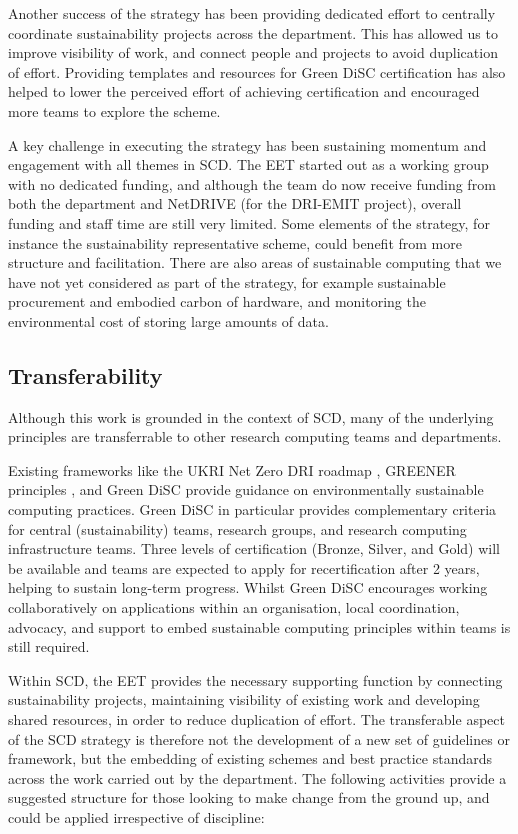 \documentclass[sigconf]{acmart}
\begin{document}
Another success of the strategy has been providing dedicated effort to centrally coordinate sustainability projects across the department. This has allowed us to improve visibility of work, and connect people and projects to avoid duplication of effort. Providing templates and resources for Green DiSC certification has also helped to lower the perceived effort of achieving certification and encouraged more teams to explore the scheme.

A key challenge in executing the strategy has been sustaining momentum and engagement with all themes in SCD. The EET started out as a working group with no dedicated funding, and although the team do now receive funding from both the department and NetDRIVE (for the DRI-EMIT project), overall funding and staff time are still very limited. Some elements of the strategy, for instance the sustainability representative scheme, could benefit from more structure and facilitation. There are also areas of sustainable computing that we have not yet considered as part of the strategy, for example sustainable procurement and embodied carbon of hardware, and monitoring the environmental cost of storing large amounts of data.

\subsection{Transferability}
Although this work is grounded in the context of SCD, many of the underlying principles are transferrable to other research computing teams and departments.

Existing frameworks like the UKRI Net Zero DRI roadmap \cite{DRINetZeroScopingReport}, GREENER principles \cite{LannelongueGREENER}, and Green DiSC \cite{GreenDiSC} provide guidance on environmentally sustainable computing practices. Green DiSC in particular provides complementary criteria for central (sustainability) teams, research groups, and research computing infrastructure teams. Three levels of certification (Bronze, Silver, and Gold) will be available and teams are expected to apply for recertification after 2 years, helping to sustain long-term progress. Whilst Green DiSC encourages working collaboratively on applications within an organisation, local coordination, advocacy, and support to embed sustainable computing principles within teams is still required.

Within SCD, the EET provides the necessary supporting function by connecting sustainability projects, maintaining visibility of existing work and developing shared resources, in order to reduce duplication of effort. The transferable aspect of the SCD strategy is therefore not the development of a new set of guidelines or framework, but the embedding of existing schemes and best practice standards across the work carried out by the department. The following activities provide a suggested structure for those looking to make change from the ground up, and could be applied irrespective of discipline:
\end{document}
